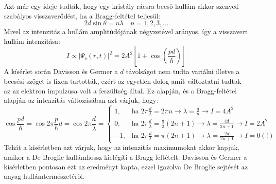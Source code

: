 \documentclass[a4paper,12pt]{article}
\begin{document}
Azt már egy ideje tudták, hogy egy kristály rácsra beeső hullám akkor szenved szabályos visszaverődést, ha a Bragg-feltétel teljesül:
\begin{equation}
2d \sin \theta = n \lambda \quad n = 1, 2, 3, ...
\end{equation}
Mivel az intenzitás a hullám amplitúdójának négyzetével arányos, így a visszavert hullám intenzitása:
\begin{equation}
I \propto |\Psi_{s}(r,t)|^2 = 2A^2 \left[1 + \cos\left(\frac{pd}{\hbar}\right)\right]
\end{equation}
A kísérlet során Davisson és Germer a $d$ távolságot nem tudta variálni illetve a beesési szöget is fixen tartották, ezért az egyetlen dolog amit változtatni tudtak az az elektron impulzusa volt a feszültség által.
Ez alapján, és a Bragg-feltétel alapján az intenzitás változásában azt várjuk, hogy:
\begin{equation}
    \cos \frac{pd}{\hbar} = \cos 2\pi \frac{p}{h} d = \cos 2\pi \frac{d}{\lambda} = \begin{cases}
1, & \text{ha } 2\pi \frac{d}{\lambda} = 2\pi n \rightarrow \lambda = \frac{d}{n} \rightarrow I = 4A^2 \\
0, & \text{ha } 2\pi \frac{d}{\lambda} = \frac{\pi}{2} (2n + 1) \rightarrow \lambda = \frac{4d}{2n + 1} \rightarrow I = 2A^2 \\
-1, & \text{ha } 2\pi \frac{d}{\lambda} = \pi (2n + 1) \rightarrow \lambda = \frac{2d}{2n + 1} \rightarrow I = 0 (!)
    \end{cases}
\end{equation}
Tehát a kísérletben azt várjuk, hogy az intenzitás maximumokat akkor kapjuk, amikor a De Broglie hullámhossz kielégíti a Bragg-feltételt. Davisson és Germer a kísérletben
pontosan ezt az eredményt kapta, ezzel igazolva De Broglie sejtését az anyag hullámtermészetéről.
\end{document}
